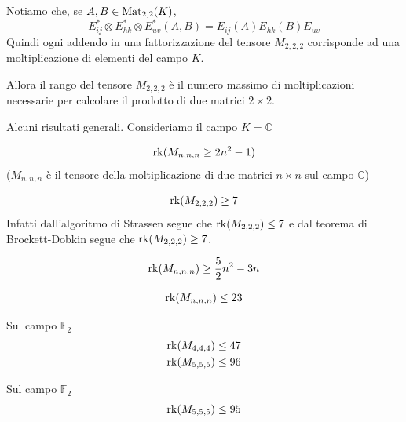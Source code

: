\documentclass[../main.tex]{subfiles}
\begin{document}
Notiamo che, se $A,B \in \operatorname{Mat}_{2,2}(K)$,
\begin{equation*}
    E_{ij}^* \otimes E_{hk}^* \otimes E_{uv}^* (A,B) = E_{ij}(A)E_{hk}(B)E_{uv}
\end{equation*}
Quindi ogni addendo in una fattorizzazione del tensore $M_{2,2,2}$ corrisponde ad una moltiplicazione di elementi del campo $K$.

Allora il rango del tensore $M_{2,2,2}$ è il numero massimo di moltiplicazioni necessarie per calcolare il prodotto di due matrici $2 \times 2$.

\newpage

Alcuni risultati generali. Consideriamo il campo $K = \mathbb{C}$
\begin{theorem}
    \begin{equation*}
        \operatorname{rk}(M_{n,n,n} \geq 2n^2 -1)
    \end{equation*}
    ($M_{n,n,n}$ è il tensore della moltiplicazione di due matrici $n \times n$ sul campo $\mathbb{C}$)
\end{theorem}
\begin{corollary}
    \begin{equation*}
        \operatorname{rk}(M_{2,2,2}) \geq 7
    \end{equation*}
    Infatti dall'algoritmo di Strassen segue che $\operatorname{rk}(M_{2,2,2}) \leq 7$ e dal teorema di Brockett-Dobkin segue che $\operatorname{rk}(M_{2,2,2}) \geq 7$.
\end{corollary}

\begin{theorem}[di Bläser (1999)]
    \begin{equation*}
        \operatorname{rk}(M_{n,n,n}) \geq \frac{5}{2}n^2 - 3n
    \end{equation*}
\end{theorem}

\begin{theorem}[di Laderman (1976)]
    \begin{equation*}
        \operatorname{rk}(M_{n,n,n}) \leq 23
    \end{equation*}
\end{theorem}

\begin{theorem}[Deepmind (2022)]
    Sul campo $\mathbb{F}_2$
    \begin{gather*}
        \operatorname{rk}(M_{4,4,4}) \leq 47\\
        \operatorname{rk}(M_{5,5,5}) \leq 96
    \end{gather*}

\end{theorem}

\begin{theorem}
    Sul campo $\mathbb{F}_2$
    \begin{equation*}
        \operatorname{rk}(M_{5,5,5}) \leq 95
    \end{equation*}
\end{theorem}
\end{document}
